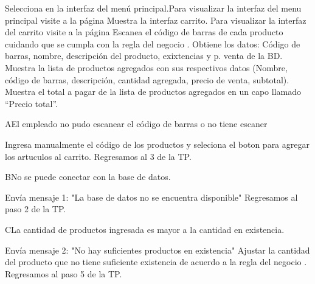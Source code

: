 \begin{UCtrayectoria}
		
	\UCpaso [\UCactor]Selecciona  en la interfaz del menú principal.Para visualizar la interfaz del menu principal visite a la página \pageref{UI: menu principal}
	\UCpaso [\UCsist]Muestra la interfaz carrito. Para visualizar la interfaz del carrito visite a la página \pageref{UI: carrito}
	\UCpaso [\UCactor]Escanea el código de barras de cada producto cuidando que se cumpla con la regla del negocio . 							
	\UCpaso [\UCsist]Obtiene los datos: Código de barras, nombre, descripción del producto, exixtencias y  p. venta de la BD. 
	\UCpaso [\UCsist]Muestra la lista de productos agregados con sus respectivos datos (Nombre, código de barras, descripción, cantidad agregada, precio de venta, subtotal). 
	\UCpaso [\UCsist]Muestra el total a pagar de la lista de productos agregados en un capo llamado “Precio total”.		

	
\end{UCtrayectoria}



\begin{UCtrayectoriaA}{A}{El empleado no pudo escanear el código de barras o no tiene escaner}

	\UCpaso [\UCactor] Ingresa manualmente el código de los productos y seleciona el boton  para agregar los artuculos al carrito.
	\UCpaso [\UCsist]Regresamos al 3 de la TP.
\end{UCtrayectoriaA}



\begin{UCtrayectoriaA}{B}{No se puede conectar con la base de datos.}

	\UCpaso [\UCsist]Envía mensaje 1: "La base de datos no se encuentra disponible"
 	\UCpaso [\UCsist]Regresamos al paso 2 de la TP.

 \end{UCtrayectoriaA}


\begin{UCtrayectoriaA}{C}{La cantidad de productos ingresada es mayor a la cantidad en existencia.}

	\UCpaso [\UCsist]Envía mensaje 2: "No hay suficientes productos en existencia"
	\UCpaso [\UCactor] Ajustar la cantidad del producto que no tiene suficiente existencia de acuerdo a la regla del negocio  .
	\UCpaso [\UCsist]Regresamos al paso 5 de la TP.

\end{UCtrayectoriaA}

